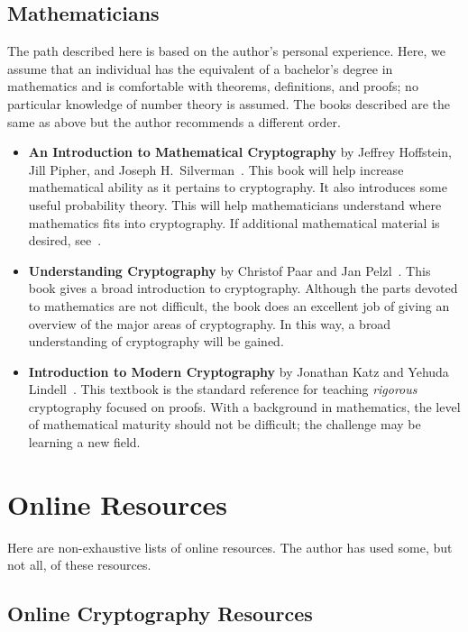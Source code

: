 \subsection{Mathematicians}

The path described here is based on the author's personal experience.
Here, we assume that an individual has the equivalent of a bachelor's
degree in mathematics and is comfortable with theorems,
definitions, and proofs;
no particular knowledge of \gls{number theory} is assumed.
The books described are the same as above but the author recommends
a different order.

\begin{itemize}
\item \textbf{An Introduction to Mathematical Cryptography}
    by Jeffrey Hoffstein, Jill Pipher,
    and Joseph H.~Silverman~\cite{IntroMathCrypto}.
    This book will help increase mathematical ability as it pertains
    to cryptography.
    It also introduces some useful probability theory.
    This will help mathematicians understand where mathematics
    fits into cryptography.
    If additional mathematical material is desired,
    see~\cite{ComputationalIntroNTA}.
\item \textbf{Understanding Cryptography} by Christof Paar
    and Jan Pelzl~\cite{UnderstandingCrypto}.
    This book gives a broad introduction to cryptography.
    Although the parts devoted to mathematics are not difficult,
    the book does an excellent job of giving an overview of the major
    areas of cryptography.
    In this way, a broad understanding of cryptography will be gained.
\item \textbf{Introduction to Modern Cryptography}
    by Jonathan Katz and Yehuda Lindell~\cite{IntroModernCrypto}.
    This textbook is the standard reference for teaching \emph{rigorous}
    cryptography focused on proofs.
    With a background in mathematics, the level of mathematical maturity
    should not be difficult;
    the challenge may be learning a new field.
\end{itemize}



\section{Online Resources}

Here are non-exhaustive lists of online resources.
The author has used some, but not all, of these resources.

\subsection{Online Cryptography Resources}
\label{ssec:conclusion_online_crypto}

